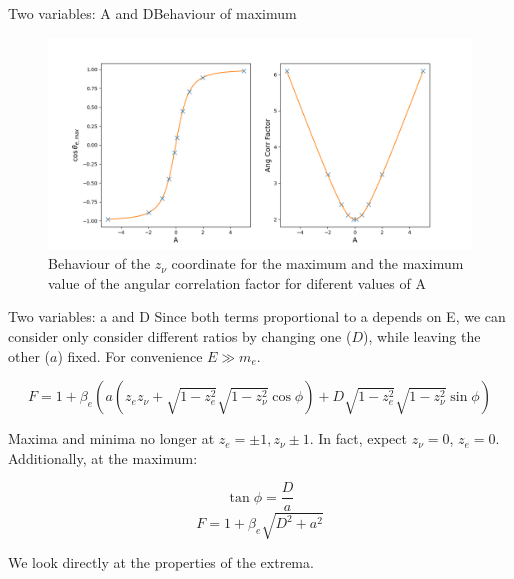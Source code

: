\documentclass{beamer}
\begin{document}
\begin{frame}{Two variables: A and D}{Behaviour of maximum}
\begin{figure}
	\centering
	\includegraphics[width=0.8\paperwidth]{plots/AD_max_behaviour}
	\caption{Behaviour of the $z_\nu$ coordinate for the maximum and the maximum value of the angular correlation factor for diferent values of A}
\end{figure}
\end{frame}
\begin{frame}{Two variables: a and D}
	Since both terms proportional to a depends on E, we can consider only consider different ratios by changing one ($D$), while leaving the other ($a$) fixed. For convenience $E \gg m_e$.
	
	$$F = 1 + \beta_e(a (z_ez_\nu + \sqrt{1-z^2_e}\sqrt{1-z^2_\nu}\cos \phi) + D\sqrt{1-z^2_e}\sqrt{1-z^2_\nu}\sin \phi)$$
	
	Maxima and minima no longer at $z_e=\pm1,z_\nu \pm1$. In fact, expect $z_\nu = 0$, $z_e = 0$. Additionally, at the maximum:
	
	$$\tan\phi = \frac Da$$
	$$F = 1 + \beta_e\sqrt{D^2+a^2}$$    
	
	We look directly at the properties of the extrema.
\end{frame}
\end{document}
